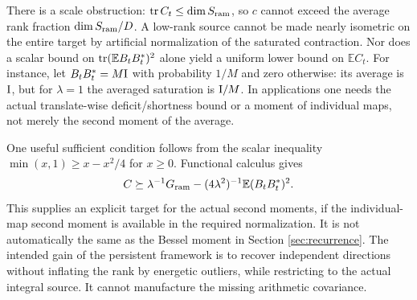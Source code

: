 \documentclass[11pt,a4paper]{article}
\begin{document}
There is a scale obstruction: $\operatorname{tr} C_t\leq\dim S_{\rm ram}$, so $c$ cannot exceed the average rank fraction $\dim S_{\rm ram}/D$. A low-rank source cannot be made nearly isometric on the entire target by artificial normalization of the saturated contraction. Nor does a scalar bound on $\operatorname{tr}(\mathbb E B_tB_t^*)^2$ alone yield a uniform lower bound on $\mathbb E C_t$. For instance, let $B_tB_t^*=M\mathrm I$ with probability $1/M$ and zero otherwise: its average is $\mathrm I$, but for $\lambda=1$ the averaged saturation is $\mathrm I/M$. In applications one needs the actual translate-wise deficit/shortness bound or a moment of individual maps, not merely the second moment of the average.

One useful sufficient condition follows from the scalar inequality $\min(x,1)\geq x-x^2/4$ for $x\geq0$. Functional calculus gives
\[
C\succeq\lambda^{-1}G_{\rm ram}-(4\lambda^2)^{-1}\mathbb E(B_tB_t^*)^2.
\]
This supplies an explicit target for the actual second moments, if the individual-map second moment is available in the required normalization. It is not automatically the same as the Bessel moment in Section \ref{sec:recurrence}. The intended gain of the persistent framework is to recover independent directions without inflating the rank by energetic outliers, while restricting to the actual integral source. It cannot manufacture the missing arithmetic covariance.
\end{document}
